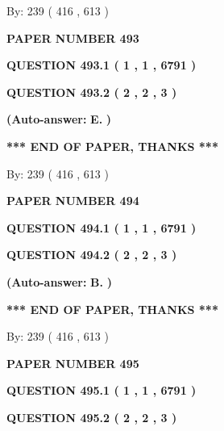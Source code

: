\documentclass[12pt]{article}
\begin{document}
   
\hspace{1.0in} By: 
 239 ( 416 ,  613 )
   
   
   
   
\newpage 
\setcounter{page}{ 
   493001 } 
   
   
 {\textbf{ \Large{ PAPER NUMBER  493  }}}
   
   
   
   
  
  
{\textbf{\large{QUESTION
493.1 
 ( 1 , 1 , 6791 )
}}}
  
  
{\textbf{\large{QUESTION
493.2 
 ( 2 , 2 , 3 )
}}}
 
 
{\textbf{(Auto-answer:}}
{\textbf{\large{
E.}}}
{\textbf{)}}
 
 
   
   
   
   
\vspace{1.0in} 
{\textbf{\large{ *** END OF PAPER, THANKS *** }}} 
   
   
\hspace{1.0in} By: 
 239 ( 416 ,  613 )
   
   
   
   
\newpage 
\setcounter{page}{ 
   494001 } 
   
   
 {\textbf{ \Large{ PAPER NUMBER  494  }}}
   
   
   
   
  
  
{\textbf{\large{QUESTION
494.1 
 ( 1 , 1 , 6791 )
}}}
  
  
{\textbf{\large{QUESTION
494.2 
 ( 2 , 2 , 3 )
}}}
 
 
{\textbf{(Auto-answer:}}
{\textbf{\large{
B.}}}
{\textbf{)}}
 
 
   
   
   
   
\vspace{1.0in} 
{\textbf{\large{ *** END OF PAPER, THANKS *** }}} 
   
   
\hspace{1.0in} By: 
 239 ( 416 ,  613 )
   
   
   
   
\newpage 
\setcounter{page}{ 
   495001 } 
   
   
 {\textbf{ \Large{ PAPER NUMBER  495  }}}
   
   
   
   
  
  
{\textbf{\large{QUESTION
495.1 
 ( 1 , 1 , 6791 )
}}}
  
  
{\textbf{\large{QUESTION
495.2 
 ( 2 , 2 , 3 )
}}}
 
\end{document}

